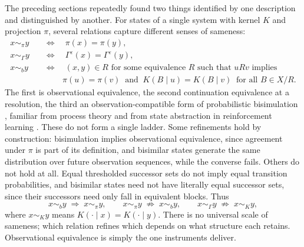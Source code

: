 \documentclass[11pt]{article}
\theoremstyle{definition}
\theoremstyle{remark}
\begin{document}
The preceding sections repeatedly found two things identified by one description and distinguished by another. For states of a single system with kernel $K$ and projection $\pi$, several relations capture different senses of sameness:
\begin{align}
x \sim_\pi y \quad &\iff\quad \pi(x) = \pi(y), \\
x \sim_\Gamma y \quad &\iff\quad \Gamma^\varepsilon(x) = \Gamma^\varepsilon(y), \\
x \sim_b y \quad &\iff\quad (x,y) \in R \text{ for some equivalence } R \text{ such that } uRv \text{ implies} \nonumber\\
&\qquad\ \pi(u) = \pi(v) \ \text{ and } \ K(B \mid u) = K(B \mid v) \ \text{ for all } B \in X/R .
\end{align}
The first is observational equivalence, the second continuation equivalence at a resolution, the third an observation-compatible form of probabilistic bisimulation \cite{larsen1991}, familiar from process theory and from state abstraction in reinforcement learning \cite{givan2003,li2006}. These do not form a single ladder. Some refinements hold by construction: bisimulation implies observational equivalence, since agreement under $\pi$ is part of its definition, and bisimilar states generate the same distribution over future observation sequences, while the converse fails. Others do not hold at all. Equal thresholded successor sets do not imply equal transition probabilities, and bisimilar states need not have literally equal successor sets, since their successors need only fall in equivalent blocks. Thus
\begin{equation}
x \sim_b y \;\Rightarrow\; x \sim_\pi y, \qquad x \sim_\pi y \;\not\Rightarrow\; x \sim_b y, \qquad x \sim_\Gamma y \;\not\Rightarrow\; x \sim_K y ,
\end{equation}
where $x \sim_K y$ means $K(\cdot \mid x) = K(\cdot \mid y)$. There is no universal scale of sameness; which relation refines which depends on what structure each retains. Observational equivalence is simply the one instruments deliver.
\end{document}

